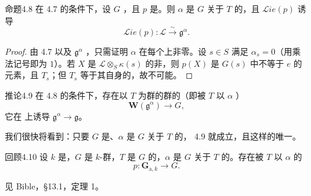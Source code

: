 \begin{SGAresult}{命题}{4.8}
在 4.7 的条件下，设 $G$ ，且 $p$ 是。则 $\alpha$ 是 $G$ 关于 $T$ 的，且 $\mathscr{L}\!ie(p)$ 诱导
\[
\mathscr{L}\!ie(p):\mathscr L\xrightarrow{\sim}\mathfrak g^\alpha.
\]
\end{SGAresult}
\begin{proof}
由 4.7 以及 $\mathfrak g^\alpha$ ，只需证明 $\alpha$ 在每个上非零。设 $s\in S$ 满足 $\alpha_s=0$（用乘法记号即为 $1$）。若 $X$ 是 $\mathscr L\otimes_S\kappa(s)$ 的非，则 $p(X)$ 是 $G(s)$ 中不等于 $e$ 的元素，且 $T_s$；但 $T_s$ 等于其自身的，故不可能。
\end{proof}
\begin{SGAresult}{推论}{4.9}
在 4.8 的条件下，存在以 $T$ 为群的群的（即被 $T$ 以 $\alpha$ ）
\[
\mathbf W(\mathfrak g^\alpha)\longrightarrow G,
\]
它在 上诱导 $\mathfrak g^\alpha\to\mathfrak g$。
\end{SGAresult}
我们很快将看到：只要 $G$ 是、$\alpha$ 是 $G$ 关于 $T$ 的，
4.9 就成立，且这样的唯一。
\begin{SGAresult}{回顾}{4.10}
设 $k$ 是，$G$ 是 $k$-群，$T$ 是 $G$ 的，$\alpha$ 是 $G$ 关于 $T$ 的。存在被 $T$ 以 $\alpha$ 的
\[
p:\mathbf G_{\mathrm a,k}\longrightarrow G.
\]
\end{SGAresult}
见 Bible，\S 13.1，定理 1。

